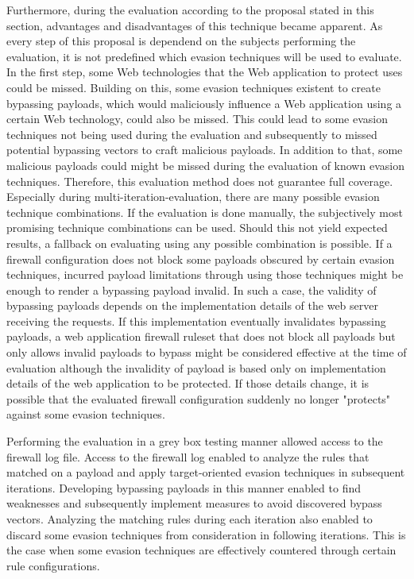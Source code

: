 Furthermore, during the evaluation according to the proposal stated in this section, advantages and disadvantages of this technique became apparent. As every step of this proposal is dependend on the subjects performing the evaluation, it is not predefined which evasion techniques will be used to evaluate. In the first step, some Web technologies that the Web application to protect uses could be missed. Building on this, some evasion techniques existent to create bypassing payloads, which would maliciously influence a Web application using a certain Web technology, could also be missed. 
This could lead to some evasion techniques not being used during the evaluation and subsequently to missed potential bypassing vectors to craft malicious payloads. In addition to that, some malicious payloads could might be missed during the evaluation of known evasion techniques. 
Therefore, this evaluation method does not guarantee full coverage. 
Especially during multi-iteration-evaluation, there are many possible evasion technique combinations. If the evaluation is done manually, the subjectively most promising technique combinations can be used. Should this not yield expected results, a fallback on evaluating using any possible combination is possible.
If a firewall configuration does not block some payloads obscured by certain evasion techniques, incurred payload limitations through using those techniques might be enough to render a bypassing payload invalid. In such a case, the validity of bypassing payloads depends on the implementation details of the web server receiving the requests. 
If this implementation eventually invalidates bypassing payloads, a web application firewall ruleset that does not block all payloads but only allows invalid payloads to bypass might be considered effective at the time of evaluation although the invalidity of payload is based only on implementation details of the web application to be protected. 
If those details change, it is possible that the evaluated firewall configuration suddenly no longer "protects" against some evasion techniques.

Performing the evaluation in a grey box testing manner allowed access to the firewall log file. Access to the firewall log enabled to analyze the rules that matched on a payload and apply target-oriented evasion techniques in subsequent iterations. Developing bypassing payloads in this manner enabled to find weaknesses and subsequently implement measures to avoid discovered bypass vectors. Analyzing the matching rules during each iteration also enabled to discard some evasion techniques from consideration in following iterations. This is the case when some evasion techniques are effectively countered through certain rule configurations. 

